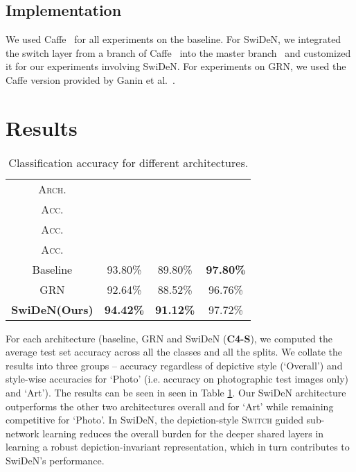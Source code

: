 \documentclass[preprint]{sig-alternate-05-2015}
\begin{document}
\subsection{Implementation}
 We used Caffe~\cite{jia2014caffe} for all experiments on the baseline. For SwiDeN, we integrated the switch layer from a branch of Caffe~\cite{caffe-dev} into the master branch~\cite{caffe-master} and customized it for our experiments involving SwiDeN. For experiments on GRN, we used the Caffe version provided by  Ganin et al.~\cite{ganin2015unsupervised}. 
 
\section{Results}
\label{sec:results}

\renewcommand{\arraystretch}{1.5}
\begin{table}[!tbp]
\centering
\footnotesize
\begin{tabular}{|c|c|c|c|}
\hline
\textsc{Arch.} & \thead{\textsc{Overall} \\ \textsc{Acc.}} & \thead{\textsc{Art} \\ \textsc{Acc.}} & \thead{\textsc{Photo} \\ \textsc{Acc.}} \\
\hline
\hline 
 Baseline & 93.80\% & 89.80\% & \textbf{97.80\%} \\
\hline
GRN & 92.64\% & 88.52\%  & 96.76\% \\
\hline
\textbf{SwiDeN(Ours)} & \textbf{94.42\%} & \textbf{91.12\%} & 97.72\% \\
\hline
\end{tabular}
\caption{Classification accuracy for different architectures.}
\label{tab:accuracy}
\end{table}

For each architecture (baseline, GRN and SwiDeN (\textbf{C4-S}), we computed the average test set accuracy across all the classes and all the splits. We collate the results into three groups -- accuracy regardless of depictive style (`Overall') and style-wise accuracies for `Photo' (i.e. accuracy on photographic test images only) and `Art'). The results can be seen in seen in Table \ref{tab:accuracy}. Our SwiDeN architecture outperforms the other two architectures overall and for `Art' while remaining competitive for `Photo'. In SwiDeN, the depiction-style \textsc{Switch} guided sub-network learning reduces the overall burden for the deeper shared layers in learning a robust depiction-invariant representation, which in turn contributes to SwiDeN's performance. 
\end{document}

